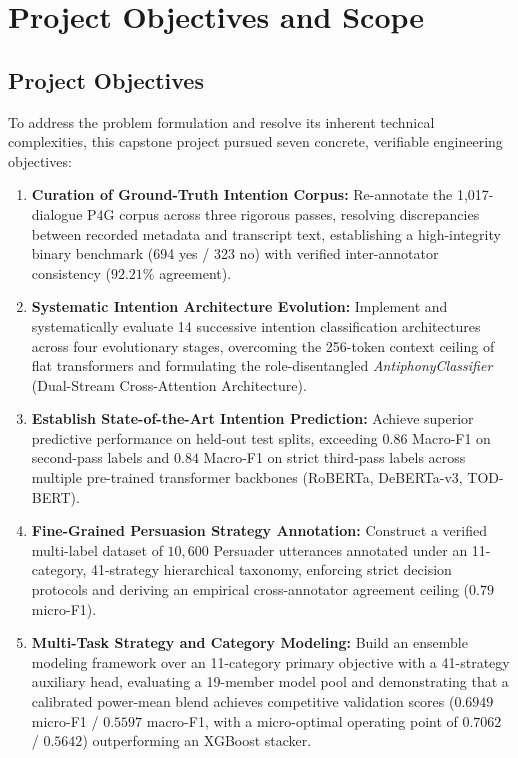 \section{Project Objectives and Scope}
\label{sec:objectives}

\subsection{Project Objectives}
To address the problem formulation and resolve its inherent technical complexities, this capstone project pursued seven concrete, verifiable engineering objectives:
\begin{enumerate}[label=\textbf{O\arabic*.}]
  \item \textbf{Curation of Ground-Truth Intention Corpus:} Re-annotate the 1,017-dialogue P4G corpus across three rigorous passes, resolving discrepancies between recorded metadata and transcript text, establishing a high-integrity binary benchmark (694 yes / 323 no) with verified inter-annotator consistency ($92.21\%$ agreement).
  \item \textbf{Systematic Intention Architecture Evolution:} Implement and systematically evaluate 14 successive intention classification architectures across four evolutionary stages, overcoming the 256-token context ceiling of flat transformers and formulating the role-disentangled \textit{AntiphonyClassifier} (Dual-Stream Cross-Attention Architecture).
  \item \textbf{Establish State-of-the-Art Intention Prediction:} Achieve superior predictive performance on held-out test splits, exceeding $0.86$ Macro-F1 on second-pass labels and $0.84$ Macro-F1 on strict third-pass labels across multiple pre-trained transformer backbones (RoBERTa, DeBERTa-v3, TOD-BERT).
  \item \textbf{Fine-Grained Persuasion Strategy Annotation:} Construct a verified multi-label dataset of $10{,}600$ Persuader utterances annotated under an 11-category, 41-strategy hierarchical taxonomy, enforcing strict decision protocols and deriving an empirical cross-annotator agreement ceiling ($0.79$ micro-F1).
  \item \textbf{Multi-Task Strategy and Category Modeling:} Build an ensemble modeling framework over an 11-category primary objective with a 41-strategy auxiliary head, evaluating a 19-member model pool and demonstrating that a calibrated power-mean blend achieves competitive validation scores ($0.6949$ micro-F1 / $0.5597$ macro-F1, with a micro-optimal operating point of $0.7062$ / $0.5642$) outperforming an XGBoost stacker.

\end{enumerate}
